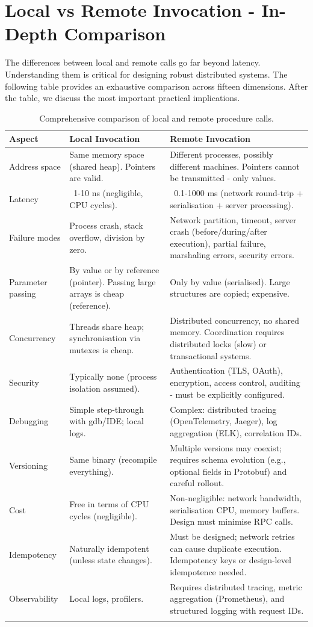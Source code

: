 \documentclass[a4paper]{article}
\begin{document}
\section{Local vs Remote Invocation - In-Depth Comparison}
The differences between local and remote calls go far beyond latency. Understanding them is critical for designing robust distributed systems. The following table provides an exhaustive comparison across fifteen dimensions. After the table, we discuss the most important practical implications.

\begin{longtable}{|p{4cm}|p{5cm}|p{5cm}|}
\hline
\textbf{Aspect} & \textbf{Local Invocation} & \textbf{Remote Invocation} \\
\hline
Address space & Same memory space (shared heap). Pointers are valid. & Different processes, possibly different machines. Pointers cannot be transmitted - only values. \\
Latency & ~1-10 ns (negligible, CPU cycles). & ~0.1-1000 ms (network round-trip + serialisation + server processing). \\
Failure modes & Process crash, stack overflow, division by zero. & Network partition, timeout, server crash (before/during/after execution), partial failure, marshaling errors, security errors. \\
Parameter passing & By value or by reference (pointer). Passing large arrays is cheap (reference). & Only by value (serialised). Large structures are copied; expensive. \\
Concurrency & Threads share heap; synchronisation via mutexes is cheap. & Distributed concurrency, no shared memory. Coordination requires distributed locks (slow) or transactional systems. \\
Security & Typically none (process isolation assumed). & Authentication (TLS, OAuth), encryption, access control, auditing - must be explicitly configured. \\
Debugging & Simple step-through with gdb/IDE; local logs. & Complex: distributed tracing (OpenTelemetry, Jaeger), log aggregation (ELK), correlation IDs. \\
Versioning & Same binary (recompile everything). & Multiple versions may coexist; requires schema evolution (e.g., optional fields in Protobuf) and careful rollout. \\
Cost & Free in terms of CPU cycles (negligible). & Non-negligible: network bandwidth, serialisation CPU, memory buffers. Design must minimise RPC calls. \\
Idempotency & Naturally idempotent (unless state changes). & Must be designed; network retries can cause duplicate execution. Idempotency keys or design-level idempotence needed. \\
Observability & Local logs, profilers. & Requires distributed tracing, metric aggregation (Prometheus), and structured logging with request IDs. \\
\hline
\caption{Comprehensive comparison of local and remote procedure calls.}
\label{tab:local_remote}
\end{longtable}
\end{document}
